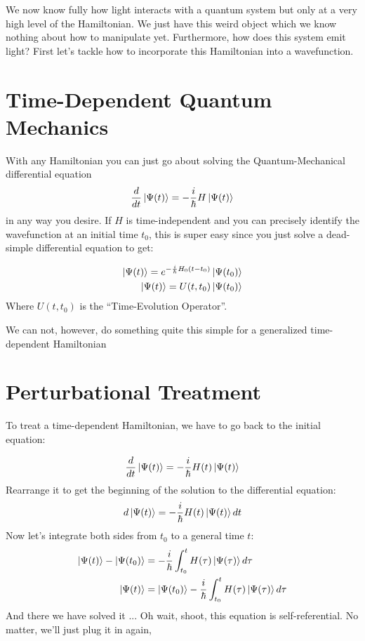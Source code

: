 We now know fully how light interacts with a quantum system but only at a very high level of the Hamiltonian.  We just have this weird object which we know nothing about how to manipulate yet.  Furthermore, how does this system emit light?  First let's tackle how to incorporate this Hamiltonian into a wavefunction.






\section{Time-Dependent Quantum Mechanics}

With any Hamiltonian you can just go about solving the  Quantum-Mechanical differential equation
\begin{align*}
	\frac{d}{dt} \Ket{\Psi(t)}  = - \frac{i}{\hbar} H \Ket{\Psi(t)}
\end{align*}
in any way you desire.  If $H$ is time-independent and you can precisely identify the wavefunction at an initial time $t_0$, this is super easy since you just solve a dead-simple differential equation to get:

\begin{align*}
	\Ket{\Psi (t)}  = e^{- \frac{i}{\hbar} H_0 (t - t_0)} \Ket{\Psi(t_0)}  \\
	\Ket{\Psi (t)}  = U(t, t_0) \Ket{\Psi(t_0)}
\end{align*}
Where $U(t, t_0)$ is the ``Time-Evolution Operator''.

We can not, however, do something quite this simple for a generalized time-dependent Hamiltonian

\section{Perturbational Treatment}
To treat a time-dependent Hamiltonian, we have to go back to the initial equation:

\begin{align*}
	\frac{d}{dt} \Ket{\Psi(t)}  = - \frac{i}{\hbar} H(t) \Ket{\Psi(t)}
\end{align*}
Rearrange it to get the beginning of the solution to the differential equation:
\begin{align*}
	d \Ket{\Psi(t)}  = - \frac{i}{\hbar} H(t)  \Ket{\Psi(t)} dt
\end{align*}
Now let's integrate both sides from $t_0$ to a general time $t$:
\begin{align*}
	\Ket{\Psi(t)} - \Ket{\Psi(t_0)}  &= - \frac{i}{\hbar} \int_{t_0}^{t} H(\tau)  \Ket{\Psi(\tau)} d\tau \\
	\Ket{\Psi(t)} & = \Ket{\Psi(t_0)} - \frac{i}{\hbar} \int_{t_0}^{t} H(\tau)  \Ket{\Psi(\tau)} d\tau
\end{align*}
And there we have solved it ... Oh wait, shoot, this equation is self-referential.  No matter, we'll just plug it in again,

